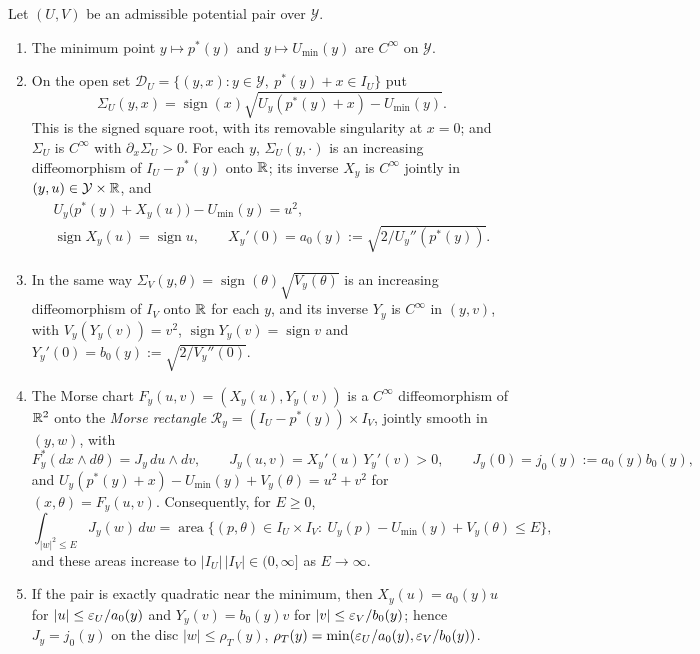 \begin{lemma}\label{lem:pln-morse-inverse}
Let $(U,V)$ be an admissible potential pair over $\mathcal Y$.
\begin{enumerate}[label=(\roman*)]
\item The minimum point $y\mapsto p^*(y)$ and $y\mapsto U_{\min}(y)$ are $C^\infty$ on $\mathcal Y$.
\item On the open set $\mathcal D_U=\{(y,x):y\in\mathcal Y,\ p^*(y)+x\in I_U\}$ put
 \[
  \Sigma_U(y,x)=\operatorname{sign}(x)\sqrt{U_y(p^*(y)+x)-U_{\min}(y)}.
 \]
 This is the signed square root, with its removable singularity at $x=0$; and $\Sigma_U$ is $C^\infty$ with
 $\partial_x\Sigma_U>0$. For each $y$, $\Sigma_U(y,\cdot)$ is an increasing diffeomorphism of
 $I_U-p^*(y)$ onto $\mathbb{R}$; its inverse $X_y$ is $C^\infty$ jointly in $(y,u)\in\mathcal Y\times\mathbb{R}$, and
 \begin{gather*}
  U_y\bigl(p^*(y)+X_y(u)\bigr)-U_{\min}(y)=u^2,\\
  \operatorname{sign}X_y(u)=\operatorname{sign}u,\qquad
  X_y'(0)=a_0(y):=\sqrt{2/U_y''(p^*(y))} .
 \end{gather*}
\item In the same way $\Sigma_V(y,\theta)=\operatorname{sign}(\theta)\sqrt{V_y(\theta)}$
 is an increasing diffeomorphism of $I_V$ onto $\mathbb{R}$ for each $y$, and its inverse $Y_y$ is $C^\infty$ in
 $(y,v)$, with $V_y(Y_y(v))=v^2$, $\operatorname{sign}Y_y(v)=\operatorname{sign}v$ and
 $Y_y'(0)=b_0(y):=\sqrt{2/V_y''(0)}$.
\item The Morse chart $F_y(u,v)=(X_y(u),Y_y(v))$ is a $C^\infty$ diffeomorphism of $\mathbb{R}^2$ onto the
 \emph{Morse rectangle} $\mathcal R_y=(I_U-p^*(y))\times I_V$, jointly smooth in $(y,w)$, with
 \[
  F_y^*(dx\wedge d\theta)=J_y\,du\wedge dv,\qquad J_y(u,v)=X_y'(u)\,Y_y'(v)>0,\qquad J_y(0)=j_0(y):=a_0(y)b_0(y),
 \]
 and $U_y(p^*(y)+x)-U_{\min}(y)+V_y(\theta)=u^2+v^2$ for $(x,\theta)=F_y(u,v)$. Consequently, for $E\ge0$,
 \[
  \int_{|w|^2\le E}J_y(w)\,dw=\operatorname{area}\bigl\{(p,\theta)\in I_U\times I_V:\ U_y(p)-U_{\min}(y)+V_y(\theta)\le E\bigr\},
 \]
 and these areas increase to $|I_U|\,|I_V|\in(0,\infty]$ as $E\to\infty$.
\item If the pair is exactly quadratic near the minimum, then $X_y(u)=a_0(y)u$ for $|u|\le\varepsilon_U/a_0(y)$
 and $Y_y(v)=b_0(y)v$ for $|v|\le\varepsilon_V/b_0(y)$; hence $J_y=j_0(y)$ on the disc $|w|\le\rho_T(y)$,
 $\rho_T(y)=\min(\varepsilon_U/a_0(y),\varepsilon_V/b_0(y))$.
\end{enumerate}
\end{lemma}

